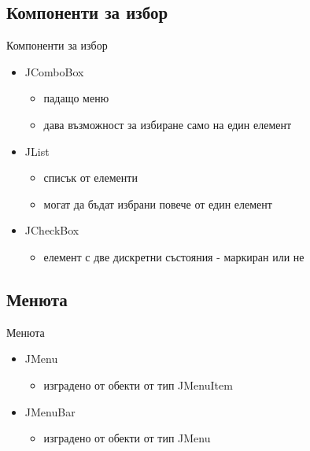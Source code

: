 \documentclass{beamer}
\begin{document}
\subsection{Компоненти за избор}
\begin{frame}{Компоненти за избор}
  \transdissolve
  \begin{itemize}
  \item JComboBox
    \begin{itemize}
      \item падащо меню
      \item дава възможност за избиране само на един елемент
    \end{itemize}
  \item JList
    \begin{itemize}
      \item списък от елементи
      \item могат да бъдат избрани повече от един елемент
    \end{itemize}
  \item JCheckBox
    \begin{itemize}
      \item елемент с две дискретни състояния - маркиран или не
    \end{itemize}
  \end{itemize}
\end{frame}

\subsection{Менюта}
\begin{frame}{Менюта}
  \transdissolve
  \begin{itemize}
  \item JMenu
    \begin{itemize}
      \item изградено от обекти от тип JMenuItem
    \end{itemize}
  \item JMenuBar
    \begin{itemize}
      \item изградено от обекти от тип JMenu
    \end{itemize}
  \end{itemize}
\end{frame}
\end{document}
